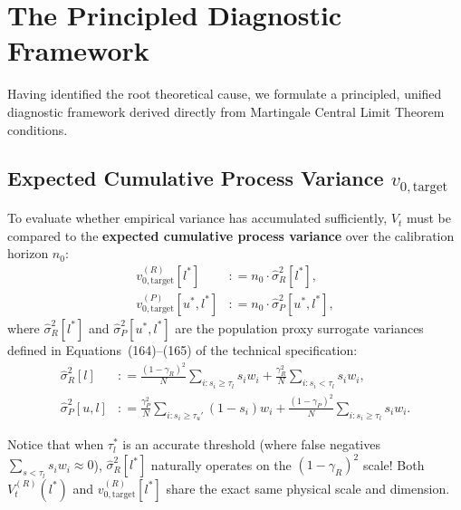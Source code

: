 \documentclass[11pt,a4paper]{article}
\newcommand{\coloneqq}{\mathrel{\mathop:}=}
\begin{document}
\newpage
\section{The Principled Diagnostic Framework}

Having identified the root theoretical cause, we formulate a principled, unified diagnostic framework derived directly from Martingale Central Limit Theorem conditions.

\subsection{Expected Cumulative Process Variance $v_{0, \text{target}}$}
To evaluate whether empirical variance has accumulated sufficiently, $V_t$ must be compared to the \textbf{expected cumulative process variance} over the calibration horizon $n_0$:
\begin{align}
v_{0, \text{target}}^{(R)}[l^*] &\coloneqq n_0 \cdot \hat{\sigma}_R^2[l^*], \label{eq:v0_target_recall} \\
v_{0, \text{target}}^{(P)}[u^*, l^*] &\coloneqq n_0 \cdot \hat{\sigma}_P^2[u^*, l^*], \label{eq:v0_target_precision}
\end{align}
where $\hat{\sigma}_R^2[l^*]$ and $\hat{\sigma}_P^2[u^*, l^*]$ are the population proxy surrogate variances defined in Equations~(164)--(165) of the technical specification:
\begin{align}
\hat{\sigma}_R^2[l] &\coloneqq \frac{(1 - \gamma_R)^2}{N}\sum_{i: s_i \ge \tau_l} s_i w_i + \frac{\gamma_R^2}{N}\sum_{i: s_i < \tau_l} s_i w_i, \\
\hat{\sigma}_P^2[u, l] &\coloneqq \frac{\gamma_P^2}{N}\sum_{i: s_i \ge \tau_u'} (1 - s_i) w_i + \frac{(1 - \gamma_P)^2}{N}\sum_{i: s_i \ge \tau_l} s_i w_i.
\end{align}

Notice that when $\tau_l^*$ is an accurate threshold (where false negatives $\sum_{s < \tau_l} s_i w_i \approx 0$), $\hat{\sigma}_R^2[l^*]$ naturally operates on the $(1 - \gamma_R)^2$ scale! Both $V_t^{(R)}(l^*)$ and $v_{0, \text{target}}^{(R)}[l^*]$ share the exact same physical scale and dimension.
\end{document}
